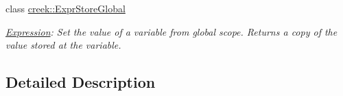 \begin{DoxyCompactItemize}
class \hyperlink{classcreek_1_1_expr_store_global}{creek\+::\+Expr\+Store\+Global}
\begin{DoxyCompactList}\small\item\em \hyperlink{classcreek_1_1_expression}{Expression}\+: Set the value of a variable from global scope. Returns a copy of the value stored at the variable. \end{DoxyCompactList}\end{DoxyCompactItemize}


\subsection{Detailed Description}

